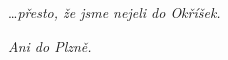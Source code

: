\vspace*{23mm}
\begin{center}
\begin{Large}
\end{Large}
\end{center}

\begin{large}
\vspace{1mm}
\hspace*{\fill}\dots\emph{přesto, že jsme nejeli do Okříšek.}
\vspace{10mm}

\hspace*{\fill}\emph{Ani do Plzně.}
\end{large}
\newpage